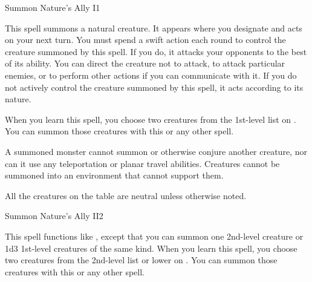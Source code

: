 \begin{spellsection}{Summon Nature's Ally I}{1}\hypertarget{spell:summon nature's ally}{}
\begin{spellheader}
    \spellrng{\rngclose}
\end{spellheader}
\begin{spellcontent}
    \spelleffect This spell summons a natural creature. It appears where you designate and acts on your next turn. You must spend a swift action each round to control the creature summoned by this spell. If you do, it attacks your opponents to the best of its ability. You can direct the creature not to attack, to attack particular enemies, or to perform other actions if you can communicate with it. If you do not actively control the creature summoned by this spell, it acts according to its nature.
    \par When you learn this spell, you choose two creatures from the 1st-level list on . You can summon those creatures with this or any other  spell.
    \par A summoned monster cannot summon or otherwise conjure another creature, nor can it use any teleportation or planar travel abilities. Creatures cannot be summoned into an environment that cannot support them.
    \par All the creatures on the table are neutral unless otherwise noted.
    \spelldur \durshort \dismissable
\end{spellcontent}
\begin{spellfooter}
\end{spellfooter}
\end{spellsection}

\begin{spellsection}{Summon Nature's Ally II}{2}
\begin{spellheader}
\end{spellheader}
\begin{spellcontent}
    \spelleffect This spell functions like , except that you can summon one 2nd-level creature or 1d3 1st-level creatures of the same kind. When you learn this spell, you choose two creatures from the 2nd-level list or lower on . You can summon those creatures with this or any other  spell.
    \spelldur \durshort \dismissable
\end{spellcontent}
\begin{spellfooter}
\end{spellfooter}
\end{spellsection}

